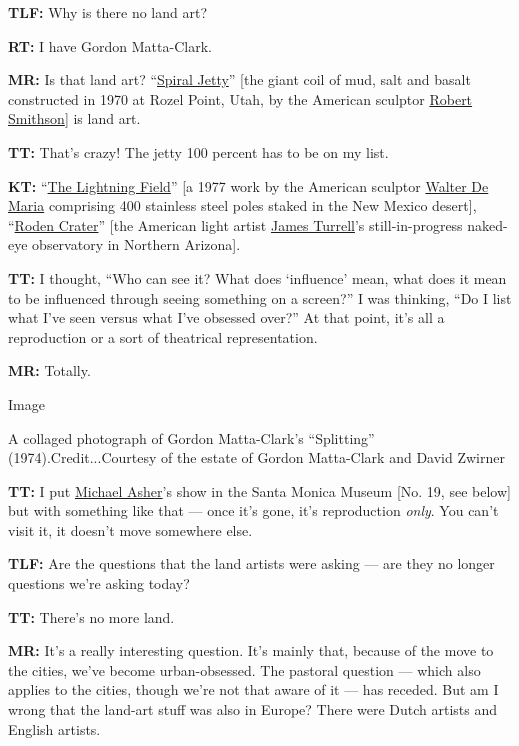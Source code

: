 \textbf{TLF:} Why is there no land art?

\textbf{RT:} I have Gordon Matta-Clark.

\textbf{MR:} Is that land art?
``\href{https://www.nytimes.com/2017/03/13/arts/design/spiral-jetty-is-named-an-official-state-work-of-art-by-utah.html}{Spiral
Jetty}'' {[}the giant coil of mud, salt and basalt constructed in 1970
at Rozel Point, Utah, by the American sculptor
\href{https://www.nytimes.com/topic/person/robert-smithson}{Robert
Smithson}{]} is land art.

\textbf{TT:} That's crazy! The jetty 100 percent has to be on my list.

\textbf{KT:}
``\href{https://www.nytimes.com/2012/06/08/arts/design/lightning-field-restoration-campaign-is-set.html}{The
Lightning Field}'' {[}a 1977 work by the American sculptor
\href{https://www.nytimes.com/2013/07/27/arts/design/walter-de-maria-artist-on-grand-scale-dies-at-77.html}{Walter
De Maria} comprising 400 stainless steel poles staked in the New Mexico
desert{]},
``\href{https://www.nytimes.com/2007/11/25/arts/design/25fink.html}{Roden
Crater}'' {[}the American light artist
\href{https://www.nytimes.com/topic/person/james-turrell}{James
Turrell}'s still-in-progress naked-eye observatory in Northern
Arizona{]}.

\textbf{TT:} I thought, ``Who can see it? What does `influence' mean,
what does it mean to be influenced through seeing something on a
screen?'' I was thinking, ``Do I list what I've seen versus what I've
obsessed over?'' At that point, it's all a reproduction or a sort of
theatrical representation.

\textbf{MR:} Totally.

Image

A collaged photograph of Gordon Matta-Clark's ``Splitting''
(1974).Credit...Courtesy of the estate of Gordon Matta-Clark and David
Zwirner

\textbf{TT:} I put
\href{https://tmagazine.blogs.nytimes.com/2010/05/28/just-looking-michael-ashers-all-nighter/}{Michael
Asher}'s show in the Santa Monica Museum {[}No. 19, see below{]} but
with something like that --- once it's gone, it's reproduction
\emph{only}. You can't visit it, it doesn't move somewhere else.

\textbf{TLF:} Are the questions that the land artists were asking ---
are they no longer questions we're asking today?

\textbf{TT:} There's no more land.

\textbf{MR:} It's a really interesting question. It's mainly that,
because of the move to the cities, we've become urban-obsessed. The
pastoral question --- which also applies to the cities, though we're not
that aware of it --- has receded. But am I wrong that the land-art stuff
was also in Europe? There were Dutch artists and English artists.

